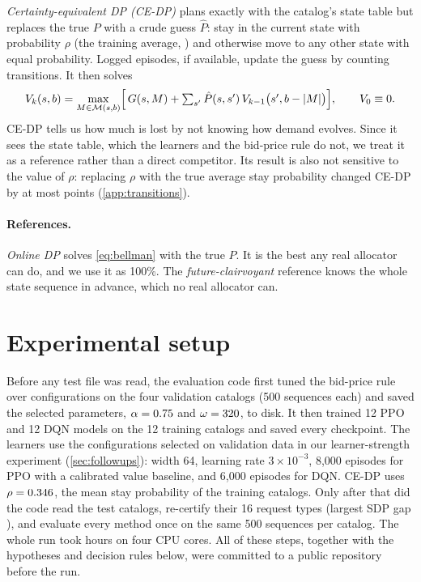 \documentclass[10pt]{article}
\newcommand{\M}{\mathcal{M}}
\begin{document}
\emph{Certainty-equivalent DP (CE-DP)} plans exactly with the catalog's state table but replaces the true $P$ with a crude guess $\hat P$: stay in the current state with probability $\rho$ (the training average, \rhoFull) and otherwise move to any other state with equal probability. Logged episodes, if available, update the guess by counting transitions. It then solves
\begin{equation}
  V_k(s,b)=\max_{M\in\M(s,b)}\Bigl[\,G(s,M)+\textstyle\sum_{s'}\hat P(s,s')\,V_{k-1}\bigl(s',b-|M|\bigr)\Bigr],\qquad V_0\equiv0.
  \label{eq:bellman}
\end{equation}
CE-DP tells us how much is lost by not knowing how demand evolves. Since it sees the state table, which the learners and the bid-price rule do not, we treat it as a reference rather than a direct competitor. Its result is also not sensitive to the value of $\rho$: replacing $\rho$ with the true average stay probability changed CE-DP by at most \trMatchMaxDiff{} points (\cref{app:transitions}).

\paragraph{References.} \emph{Online DP} solves \cref{eq:bellman} with the true $P$. It is the best any real allocator can do, and we use it as 100\%. The \emph{future-clairvoyant} reference knows the whole state sequence in advance, which no real allocator can.

\section{Experimental setup}\label{sec:protocol}

Before any test file was read, the evaluation code first tuned the bid-price rule over \bpConfigs{} configurations on the four validation catalogs (500 sequences each) and saved the selected parameters, $\alpha=0.75$ and $\omega=320$, to disk. It then trained 12 PPO and 12 DQN models on the 12 training catalogs and saved every checkpoint. The learners use the configurations selected on validation data in our learner-strength experiment (\cref{sec:followups}): width 64, learning rate $3\times10^{-3}$, 8{,}000 episodes for PPO with a calibrated value baseline, and 6{,}000 episodes for DQN. CE-DP uses $\rho=0.346$, the mean stay probability of the training catalogs. Only after that did the code read the test catalogs, re-certify their 16 request types (largest SDP gap \cfSdpMax), and evaluate every method once on the same 500 sequences per catalog. The whole run took \cfWallHours{} hours on four CPU cores. All of these steps, together with the hypotheses and decision rules below, were committed to a public repository before the run.
\end{document}
